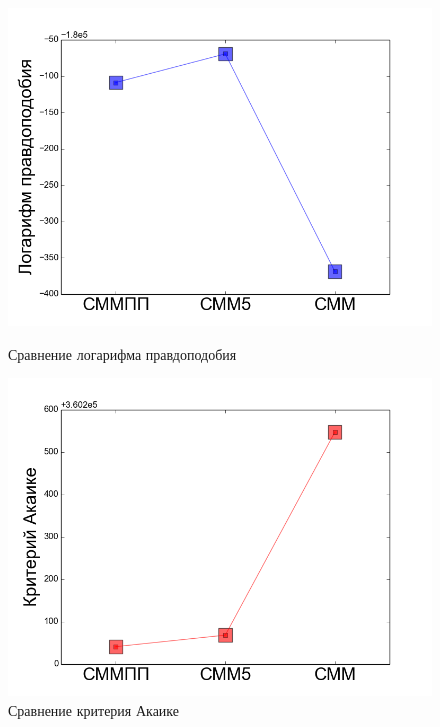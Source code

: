 \documentclass{matmex-diploma-custom}
\begin{document}
\begin{figure}[h!]\centering
\begin{minipage}[b]{0.32 \textwidth}
	\includegraphics[scale=0.28]{img/real/log_p.png}
	\centering
	\caption{ Сравнение логарифма правдоподобия}
	\label{fig:real_comp_log_p}
\end{minipage}
\hfill
\begin{minipage}[b]{0.32 \textwidth}
	\includegraphics[scale=0.28]{img/real/aic.png}
	\centering
	\caption{ Сравнение критерия Акаике }
	\label{fig:real_comp_aic}
\end{minipage}
\hfill
\begin{minipage}[b]{0.32 \textwidth}

\end{minipage}
\end{figure}
\end{document}
